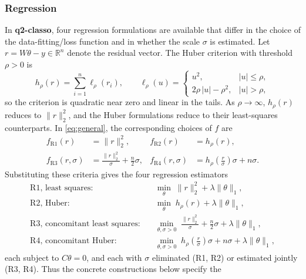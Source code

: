 \documentclass[11pt,a4paper]{article}
\newcommand{\pkg}[1]{\textbf{#1}}
\newcommand{\R}{\mathbb{R}}
\begin{document}
\subsubsection{Regression}

In \pkg{q2-classo}, four regression formulations are available that differ in
the choice of the data-fitting/loss function and in whether the scale $\sigma$
is estimated. Let $r = W\theta - y \in \R^{n}$ denote the residual vector. The Huber criterion with
threshold $\rho > 0$ is
\begin{equation}
\label{eq:huber}
h_{\rho}(r) = \sum_{i=1}^{n} \ell_{\rho}(r_i),
\qquad
\ell_{\rho}(u) =
\begin{cases}
u^{2}, & |u| \le \rho, \\[2pt]
2\rho\,|u| - \rho^{2}, & |u| > \rho,
\end{cases}
\end{equation}
so the criterion is quadratic near zero and linear in the tails. As
$\rho \to \infty$, $h_{\rho}(r)$ reduces to $\lVert r \rVert_{2}^{2}$, and the
Huber formulations reduce to their least-squares counterparts. In
\eqref{eq:general}, the corresponding choices of $f$ are
\begin{align}
f_{\mathrm{R1}}(r) &= \lVert r \rVert_{2}^{2}, &
f_{\mathrm{R2}}(r) &= h_{\rho}(r), \nonumber\\
f_{\mathrm{R3}}(r,\sigma) &=
\frac{\lVert r \rVert_{2}^{2}}{\sigma} + \frac{n}{2}\sigma, &
f_{\mathrm{R4}}(r,\sigma) &=
h_{\rho}\!\left(\frac{r}{\sigma}\right)\sigma + n\sigma .
\label{eq:fit-criteria}
\end{align}
Substituting these criteria gives the four regression estimators
\begin{align}
\text{R1, least squares:}\quad
&\min_{\theta}\; \lVert r \rVert_{2}^{2} + \lambda\lVert\theta\rVert_{1},
\label{eq:R1}\\[2pt]
\text{R2, Huber:}\quad
&\min_{\theta}\; h_{\rho}(r) + \lambda\lVert\theta\rVert_{1},
\label{eq:R2}\\[2pt]
\text{R3, concomitant least squares:}\quad
&\min_{\theta,\sigma>0}\;
\frac{\lVert r \rVert_{2}^{2}}{\sigma} + \frac{n}{2}\sigma
+ \lambda\lVert\theta\rVert_{1},
\label{eq:R3}\\[2pt]
\text{R4, concomitant Huber:}\quad
&\min_{\theta,\sigma>0}\;
h_{\rho}\!\left(\frac{r}{\sigma}\right)\sigma + n\sigma
+ \lambda\lVert\theta\rVert_{1},
\label{eq:R4}
\end{align}
each subject to $C\theta = 0$, and each with $\sigma$ eliminated (R1, R2) or
estimated jointly (R3, R4). Thus the concrete constructions below specify the
\end{document}
